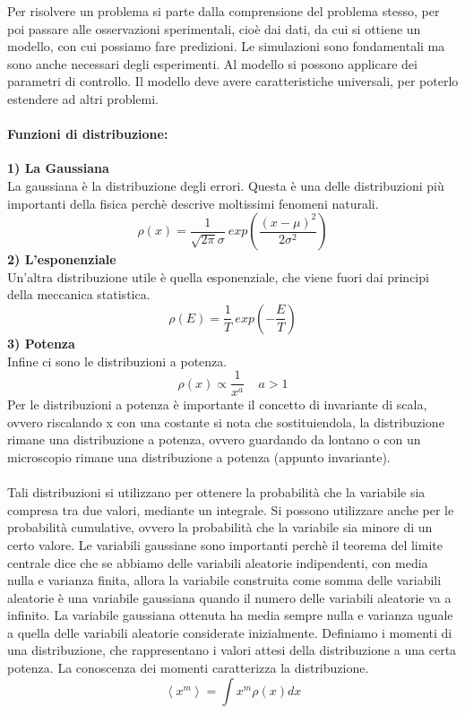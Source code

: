 \documentclass[12pt]{article}
\newcommand{\lang}{\left\langle}
\newcommand{\rang}{\right\rangle}
\begin{document}
Per risolvere un problema si parte dalla comprensione del problema stesso, per poi passare alle osservazioni sperimentali, cioè dai dati, da cui si ottiene un modello, con cui possiamo fare predizioni. Le simulazioni sono fondamentali ma sono anche necessari degli esperimenti. Al modello si possono applicare dei parametri di controllo. Il modello deve avere caratteristiche universali, per poterlo estendere ad altri problemi. \\
\paragraph{Funzioni di distribuzione: \\} 
\textbf{1) La Gaussiana \\}La gaussiana  è la distribuzione degli errori. Questa è una delle distribuzioni più importanti della fisica perchè descrive moltissimi fenomeni naturali.
\begin{equation}
	\rho(x) = \frac{1}{\sqrt{2\pi}\sigma} \ exp \left( \frac{(x-\mu)^2}{2\sigma^2} \right)
\end{equation} 
\textbf{2) L'esponenziale \\}
Un'altra distribuzione utile è quella esponenziale, che viene fuori dai principi della meccanica statistica.
\begin{equation}
	\rho(E) = \frac{1}{T} \ exp\left(-\frac{E}{T}\right)
\end{equation} 
\textbf{3) Potenza \\}
Infine ci sono le distribuzioni a potenza. 
\begin{equation}
	\rho(x) \propto \frac{1}{x^a} \ \ \ \ \  a > 1
\end{equation}
Per le distribuzioni a potenza è importante il concetto di invariante di scala, ovvero riscalando x con una costante si nota che sostituiendola, la distribuzione rimane una distribuzione a potenza, ovvero guardando da lontano o con un microscopio rimane una distribuzione a potenza (appunto invariante). \\ \\
Tali distribuzioni si utilizzano per ottenere la probabilità che la variabile sia compresa tra due valori, mediante un integrale. Si possono utilizzare anche per le probabilità cumulative, ovvero la probabilità che la variabile sia minore di un certo valore.  Le variabili gaussiane sono importanti perchè il teorema del limite centrale dice che se abbiamo delle variabili aleatorie indipendenti, con media nulla e varianza finita, allora la variabile construita come somma delle variabili aleatorie è una variabile gaussiana quando il numero delle variabili aleatorie va a infinito. La variabile gaussiana ottenuta ha media sempre nulla e varianza uguale a quella delle variabili aleatorie considerate inizialmente. Definiamo i momenti di una distribuzione, che rappresentano i valori attesi della distribuzione a una certa potenza. La conoscenza dei momenti caratterizza la distribuzione. 
$$
	\lang x^m \rang = \int x^m \rho(x)dx
$$
\end{document}
